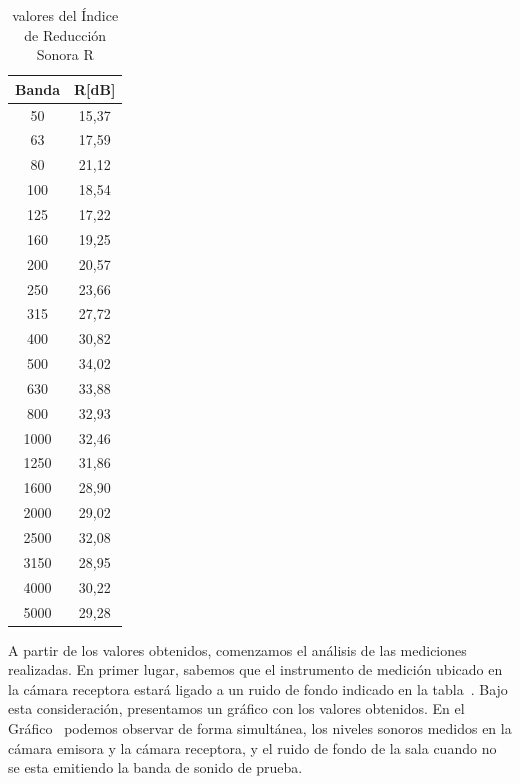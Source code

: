 \begin{table}[H]
    \centering
    \begin{tabular}{|c|c|} \hline
        \textbf{Banda} & \textbf{R[dB]} \\\hline
        50 & 15,37\\\hline
        63 & 17,59\\\hline
        80 & 21,12 \\\hline
        100 & 18,54\\\hline
        125 & 17,22\\\hline
        160 & 19,25\\\hline
        200 & 20,57\\\hline
        250 & 23,66\\\hline
        315 & 27,72\\\hline
        400 & 30,82\\\hline
        500 & 34,02\\\hline
        630 & 33,88\\\hline
        800 & 32,93\\\hline
        1000& 32,46\\\hline
        1250& 31,86\\\hline
        1600& 28,90\\\hline
        2000& 29,02\\\hline
        2500& 32,08\\\hline
        3150& 28,95\\\hline
        4000& 30,22\\\hline
        5000& 29,28\\\hline
    \end{tabular}
    \caption{valores del Índice de Reducción Sonora R}
    \label{tab:reduccion_sonora_R}
\end{table}

\par A partir de los valores obtenidos, comenzamos el análisis de las mediciones realizadas. En primer lugar, sabemos que el instrumento de medición ubicado en la cámara receptora estará ligado a un ruido de fondo indicado en la tabla~. Bajo esta consideración, presentamos un gráfico con los valores obtenidos. En el Gráfico~ podemos observar de forma simultánea, los niveles sonoros medidos en la cámara emisora y la cámara receptora, y el ruido de fondo de la sala cuando no se esta emitiendo la banda de sonido de prueba.

